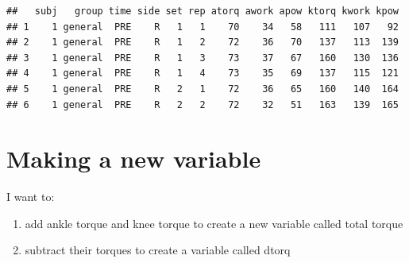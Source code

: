 \documentclass[
]{book}
\newenvironment{Shaded}{\begin{snugshade}}{\end{snugshade}}
\newcommand{\CommentTok}[1]{\textcolor[rgb]{0.56,0.35,0.01}{\textit{#1}}}
\newcommand{\DataTypeTok}[1]{\textcolor[rgb]{0.13,0.29,0.53}{#1}}
\newcommand{\KeywordTok}[1]{\textcolor[rgb]{0.13,0.29,0.53}{\textbf{#1}}}
\newcommand{\NormalTok}[1]{#1}
\newcommand{\OperatorTok}[1]{\textcolor[rgb]{0.81,0.36,0.00}{\textbf{#1}}}
\newcommand{\StringTok}[1]{\textcolor[rgb]{0.31,0.60,0.02}{#1}}
\providecommand{\tightlist}{%
  \setlength{\itemsep}{0pt}\setlength{\parskip}{0pt}}
\begin{document}
\begin{Shaded}
\end{Shaded}

\begin{verbatim}
##   subj   group time side set rep atorq awork apow ktorq kwork kpow
## 1    1 general  PRE    R   1   1    70    34   58   111   107   92
## 2    1 general  PRE    R   1   2    72    36   70   137   113  139
## 3    1 general  PRE    R   1   3    73    37   67   160   130  136
## 4    1 general  PRE    R   1   4    73    35   69   137   115  121
## 5    1 general  PRE    R   2   1    72    36   65   160   140  164
## 6    1 general  PRE    R   2   2    72    32   51   163   139  165
\end{verbatim}

\hypertarget{making-a-new-variable}{%
\section{Making a new variable}\label{making-a-new-variable}}

I want to:

\begin{enumerate}
\def\labelenumi{\arabic{enumi}.}
\tightlist
\item
  add ankle torque and knee torque to create a new variable called total torque
\item
  subtract their torques to create a variable called dtorq
\end{enumerate}

\begin{Shaded}
\end{Shaded}
\end{document}
